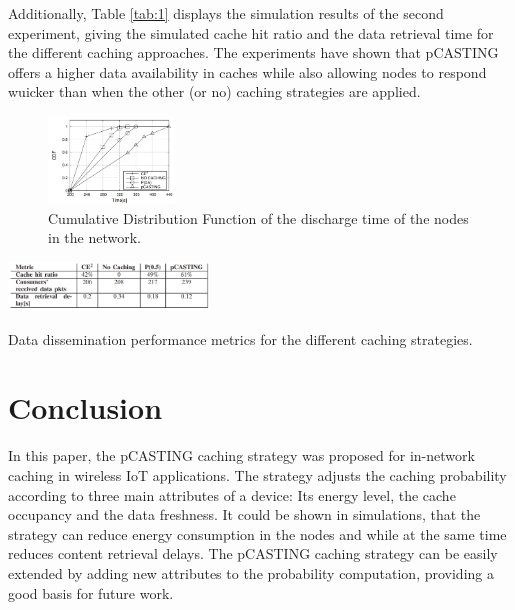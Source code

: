 \documentclass[conference]{IEEEtran}
\begin{document}
Additionally, Table \ref{tab:1} displays the simulation results of the second experiment, giving the simulated cache hit ratio and the data retrieval time for the different caching approaches. The experiments have shown that {pCASTING} offers a higher data availability in caches while also allowing nodes to respond wuicker than when the other (or no) caching strategies are applied.

\begin{figure}
	\begin{center}
	\includegraphics[width=0.3\textwidth]{fig1.png}
	\end{center}

	\label{fig:1}
	\caption{Cumulative Distribution Function of the discharge time of the nodes in the network.}
\end{figure} 

\begin{table}
	\begin{center}
		\includegraphics[width=0.4\textwidth]{tab1.png}
	\end{center}
	\label{tab:1}
	\caption{Data dissemination performance metrics for the different caching strategies.}
\end{table}

\section{Conclusion}
\label{sec:conclusion}

In this paper, the {pCASTING} caching strategy was proposed for in-network caching in wireless IoT applications. The strategy adjusts the caching probability according to three main attributes of a device: Its energy level, the cache occupancy and the data freshness. It could be shown in simulations, that the strategy can reduce energy consumption in the nodes and while at the same time reduces content retrieval delays. The {pCASTING} caching strategy can be easily extended by adding new attributes to the probability computation, providing a good basis for future work.

\printbibliography
\end{document}
